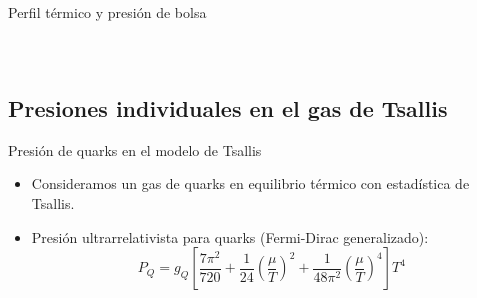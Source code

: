 \documentclass{beamer}
\begin{document}
\begin{frame}{Perfil térmico y presión de bolsa}
\begin{columns}
{    }

  \end{columns}
\end{frame}

\subsection{Presiones individuales en el gas de Tsallis}
\begin{frame}{Presión de quarks en el modelo de Tsallis}
  \begin{itemize}
    \item Consideramos un gas de quarks en equilibrio térmico con estadística de Tsallis.
    \item Presión ultrarrelativista para quarks (Fermi-Dirac generalizado):
    \[
    P_Q = g_Q \left[ \frac{7\pi^2}{720} + \frac{1}{24} \left( \frac{\mu}{T} \right)^2 +
    \frac{1}{48\pi^2} \left( \frac{\mu}{T} \right)^4 \right] T^4
    \]
  \end{itemize}
\end{frame}
\end{document}
